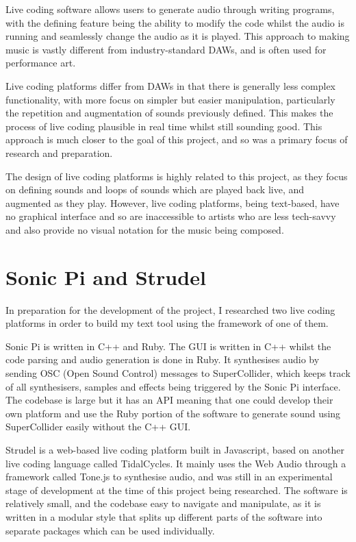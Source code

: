 \documentclass[12pt,a4paper,twoside,openright]{report}
\begin{document}
Live coding software allows users to generate audio through writing programs, with the defining feature being the ability to modify the code whilst the audio is running and seamlessly change the audio as it is played. This approach to making music is vastly different from industry-standard DAWs, and is often used for performance art.

Live coding platforms differ from DAWs in that there is generally less complex functionality, with more focus on simpler but easier manipulation, particularly the repetition and augmentation of sounds previously defined. This makes the process of live coding plausible in real time whilst still sounding good. This approach is much closer to the goal of this project, and so was a primary focus of research and preparation.

The design of live coding platforms is highly related to this project, as they focus on defining sounds and loops of sounds which are played back live, and augmented as they play. However, live coding platforms, being text-based, have no graphical interface and so are inaccessible to artists who are less tech-savvy and also provide no visual notation for the music being composed.

\section{Sonic Pi and Strudel}
In preparation for the development of the project, I researched two live coding platforms in order to build my text tool using the framework of one of them.

Sonic Pi is written in C++ and Ruby. The GUI is written in C++ whilst the code parsing and audio generation is done in Ruby. It synthesises audio by sending OSC (Open Sound Control) messages to SuperCollider, which keeps track of all synthesisers, samples and effects being triggered by the Sonic Pi interface. The codebase is large but it has an API meaning that one could develop their own platform and use the Ruby portion of the software to generate sound using SuperCollider easily without the C++ GUI.

Strudel is a web-based live coding platform built in Javascript, based on another live coding language called TidalCycles. It mainly uses the Web Audio through a framework called Tone.js to synthesise audio, and was still in an experimental stage of development at the time of this project being researched. The software is relatively small, and the codebase easy to navigate and manipulate, as it is written in a modular style that splits up different parts of the software into separate packages which can be used individually.
\end{document}
